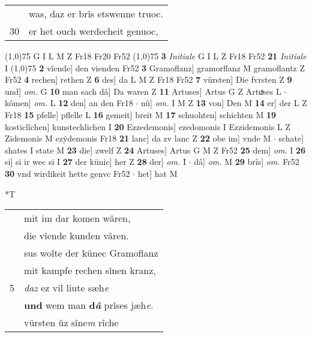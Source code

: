 \documentclass[8pt,a4paper,notitlepage]{article}
\begin{document}
\begin{table}[ht]
\begin{minipage}[t]{0.5\linewidth}
\begin{tabular}{rl}
 & was, daz er brîs etswenne truoc.\\ 
30 & er het ouch werdecheit genuoc,\\ 
\end{tabular}
\scriptsize
\line(1,0){75} \newline
G I L M Z Fr18 Fr20 Fr52 \newline
\line(1,0){75} \newline
\textbf{3} \textit{Initiale} G I L Z Fr18 Fr52  \textbf{21} \textit{Initiale} I  \newline
\line(1,0){75} \newline
\textbf{2} vîende] den vienden Fr52 \textbf{3} Gramoflanz] gramorflanz M gramoflantz Z Fr52 \textbf{4} rechen] rethen Z \textbf{6} des] da L M Z Fr18 Fr52 \textbf{7} vürsten] Die fvrsten Z \textbf{9} und] \textit{om.} G \textbf{10} man sach dâ] Da waren Z \textbf{11} Artuses] Artus G Z Artuͯses L  $\cdot$ kômen] \textit{om.} L \textbf{12} den] an den Fr18  $\cdot$ nû] \textit{om.} I M Z \textbf{13} von] Den M \textbf{14} er] der L Z Fr18 \textbf{15} pfelle] pflelle L \textbf{16} gemeit] breit M \textbf{17} schuohten] schichten M \textbf{19} kosticlîchen] kunstechlichen I \textbf{20} Ezzedemonis] ezedomonis I Ezzidemonis L Z Zidemonis M ezẏdemonis Fr18 \textbf{21} lanc] da zv lanc Z \textbf{22} obe im] vnde M  $\cdot$ schate] shates I state M \textbf{23} die] zwelf Z \textbf{24} Artuses] Artus G M Z Fr52 \textbf{25} dem] \textit{om.} I \textbf{26} si] si ir wec si I \textbf{27} der künic] her Z \textbf{28} der] \textit{om.} I  $\cdot$ dâ] \textit{om.} M \textbf{29} brîs] \textit{om.} Fr52 \textbf{30} vnd wirdikeit hette genvc Fr52  $\cdot$ het] hat M \newline
\end{minipage}
\hspace{0.5cm}
\begin{minipage}[t]{0.5\linewidth}
\small
\begin{center}*T
\end{center}
\begin{tabular}{rl}
 & mit im dar komen wâren,\\ 
 & die vîende kunden vâren.\\ 
 & sus wolte der künec Gramoflanz\\ 
 & mit kampfe rechen sînen kranz,\\ 
5 & \textit{daz} ez vil liute sæh\textit{e}\\ 
 & \textbf{und} wem man \textbf{d\textit{â}} prîses jæh\textit{e}.\\ 
 & vürsten ûz sîne\textit{m} rîche\\ 

\end{tabular}
\end{minipage}
\end{table}
\end{document}
